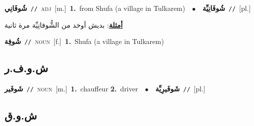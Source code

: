 \documentclass[10pt,a4paper,twoside]{article} %
\begin{document}
\begin{multicols}{2}
{\setlength\topsep{0pt}\textbf{\foreignlanguage{arabic}{شُوفَانِي}}\ {\color{gray}\texttt{//}\color{black}}\ \textsc{adj}\ [m.]\ \textbf{1.}~from Shufa (a village in Tulkarem)\ \ $\bullet$\ \ \setlength\topsep{0pt}\textbf{\foreignlanguage{arabic}{شُوفَانِيِّة}}\ {\color{gray}\texttt{//}\color{black}}\ [pl.]\  \begin{flushright}\color{gray}\foreignlanguage{arabic}{\textbf{\underline{\foreignlanguage{arabic}{أمثلة}}}: بديش أوخد من الشُّوفانِيِّة مرة ثانية}\end{flushright}\color{black}} \vspace{2mm}

{\setlength\topsep{0pt}\textbf{\foreignlanguage{arabic}{شُوفِة}}\ {\color{gray}\texttt{//}\color{black}}\ \textsc{noun}\ [f.]\ \textbf{1.}~Shufa (a village in Tulkarem)\ } \vspace{2mm}

\vspace{-3mm}
\subsection*{\color{blue}\foreignlanguage{arabic}{ش.و.ف.ر}\color{blue}{ (ntws)}} 

{\setlength\topsep{0pt}\textbf{\foreignlanguage{arabic}{شَوفَير}}\ {\color{gray}\texttt{//}\color{black}}\ \textsc{noun}\ [m.]\ \textbf{1.}~chauffeur  \textbf{2.}~driver\ \ $\bullet$\ \ \setlength\topsep{0pt}\textbf{\foreignlanguage{arabic}{شَوفَيرِيِّة}}\ {\color{gray}\texttt{//}\color{black}}\ [pl.]\ } \vspace{2mm}

\vspace{-3mm}
\subsection*{\color{blue}\foreignlanguage{arabic}{ش.و.ق}\color{blue}{}} 


\end{multicols}
\end{document}
